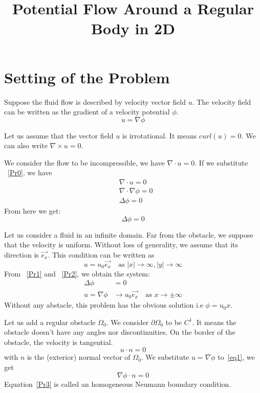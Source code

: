 \documentclass[a4paper,12pt]{article}
\title{Potential Flow Around a Regular Body in 2D}
\author{}
\date{}
\begin{document}
\maketitle
\section{Setting of the Problem}

Suppose the fluid flow is described by velocity vector field $u$. The velocity field can be written as the gradient 
of a velocity potential $\phi$. 
\begin{equation}\label{Pr0}
 u=\nabla \phi
\end{equation}

Let us assume that the vector field $u$ is irrotational. It means 
$curl(u)=0$. We can also write
$\nabla\times u=0$.

We consider the flow to be incompressible, we have $\nabla\cdot u=0$. If we substitute ~\eqref{Pr0}, we have
\begin{align}
&\nabla \cdot u=0 \\
 &\nabla \cdot \nabla\phi=0 \\
 &\Delta \phi=0
\end{align}
From here we get:
\begin{equation} \label{Pr1}
 \Delta \phi=0
\end{equation}

Let us consider a fluid in an infinite domain. Far from the obstacle, we suppose that the velocity is uniform. Without loss of generality, 
we assume that its direction is $\vec{e_x}$. 
This condition can be written as
\begin{equation} \label{Pr2}
u=u_0\vec{e_x} \quad \text{as }|x|\to\infty, |y|\to\infty
\end{equation}
From ~\eqref{Pr1} and ~\eqref{Pr2}, we obtain the system:
\begin{align} \label{problem1}
\Delta \phi &=0\\
u=\nabla \phi &\to u_0 \vec{e_x} \quad \text{as } x\to\pm\infty
\end{align}
Without any abstacle, this problem has the obvious solution i.e $\phi= u_0 x$.

Let us add a regular obstacle $\Omega_0$. We consider $\partial\Omega_0$ to be $C^1$. It means the obstacle doesn't have any angles nor discontinuities. 
On the border of the obstacle, the velocity is tangential.
\begin{equation}\label{eq1}
u\cdot n=0
\end{equation}
with $n$ is the (exterior) normal vector of $\Omega_0$.
We substitute $u=\nabla\phi$ to~\eqref{eq1}, we get 
\begin{equation}\label{Pr3}
\nabla\phi\cdot n=0
\end{equation}
Equation~\eqref{Pr3} is called an homogeneous Neumann boundary condition.  
\end{document}
